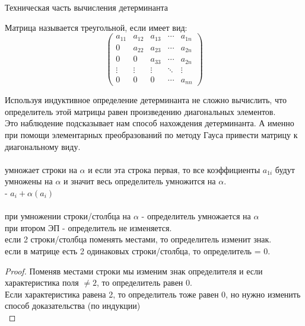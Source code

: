 \begin{title}[\Large]
  Техническая часть вычисления детерминанта
\end{title}

Матрица называется треугольной, если имеет вид:
\begin{displaymath}
\left(\begin{array}{lcccr}
a_{11} & a_{12} & a_{13} & \cdots & a_{1n}\\
0      & a_{22} & a_{23 }& \cdots & a_{2n}\\
0      & 0      & a_{33} & \cdots & a_{2n}\\
\vdots & \vdots & \vdots & \ddots & \vdots\\
0      & 0      & 0      & \cdots & a_{nn}
\end{array}\right)
\end{displaymath}

Используя индуктивное определение детерминанта не сложно вычислить, что
определитель этой матрицы равен произведению диагональных элементов.\\
Это наблюдение подсказывает нам способ нахождения детерминанта. А именно при
помощи элементарных преобразований по методу Гауса привести матрицу к
диагональному виду.\\
\\
 умножает строки на $\alpha$ и если эта строка первая, то все
коэффициенты $a_{1i}$ будут умножены на $\alpha$ и значит весь определитель
умножится на $\alpha$.\\
 - $a_i + \alpha(a_i)$\\

\\
 при умножении строки/столбца на $\alpha$ - определитель умножается на
$\alpha$\\
 при втором ЭП - определитель не изменяется.\\
 если 2 строки/столбца поменять местами, то определитель изменит знак.\\
 если в матрице есть 2 одинаковых строки/столбца, то определитель = 0.\\

\begin{proof}
  Поменяв местами строки мы изменим знак определителя и если характеристика поля
  $\not = 2$, то определитель равен 0.\\
  Если характеристика равена 2, то определитель тоже равен 0, но нужно изменить
  способ доказательства (по индукции)\\
\end{proof}

